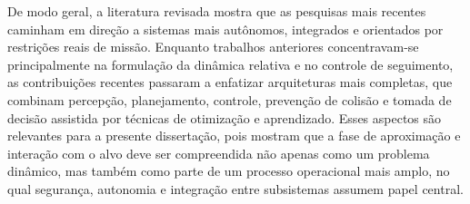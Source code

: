 De modo geral, a literatura revisada mostra que as pesquisas mais recentes caminham em direção a sistemas mais autônomos, integrados e orientados por restrições reais de missão. Enquanto trabalhos anteriores concentravam-se principalmente na formulação da dinâmica relativa e no controle de seguimento, as contribuições recentes passaram a enfatizar arquiteturas mais completas, que combinam percepção, planejamento, controle, prevenção de colisão e tomada de decisão assistida por técnicas de otimização e aprendizado. Esses aspectos são relevantes para a presente dissertação, pois mostram que a fase de aproximação e interação com o alvo deve ser compreendida não apenas como um problema dinâmico, mas também como parte de um processo operacional mais amplo, no qual segurança, autonomia e integração entre subsistemas assumem papel central.